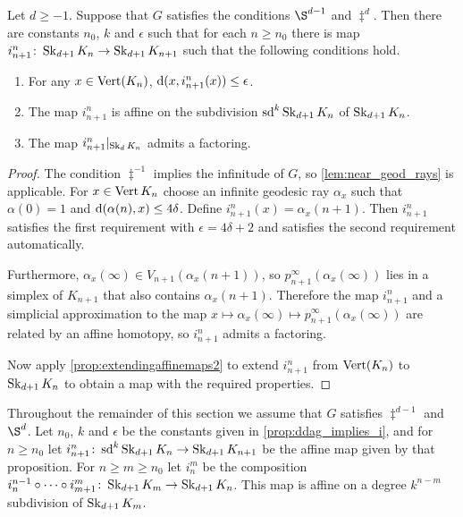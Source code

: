 \documentclass[a4paper]{article}
\begin{document}
\begin{proposition}\label{prop:ddag_implies_i}
  Let $d \geq -1$. Suppose that $G$ satisfies the conditions $\S^{d-1}$ and
  $\ddag^{d}$. Then there are constants $n_0$, $k$ and $\epsilon$ such that for
  each $n\geq n_0$ there is map $i^n_{n+1}\colon\operatorname{Sk}_{d+1} K_n \to \operatorname{Sk}_{d+1}
  K_{n+1}$ such that the following conditions hold.
  \begin{enumerate}
    \item For any $x \in \operatorname{Vert}(K_n)$, $\operatorname{d}(x, i_{n+1}^n(x)) \leq
      \epsilon$.
    \item The map $i^n_{n+1}$ is affine on the subdivision $\operatorname{sd}^k\operatorname{Sk}_{d+1}
      K_n$ of $\operatorname{Sk}_{d+1}K_n$.
    \item The map $i^n_{n+1}\vert_{\operatorname{Sk}_d K_n}$ admits a factoring.
  \end{enumerate}
\end{proposition}

\begin{proof}
  The condition $\ddag^{-1}$ implies the infinitude of $G$, so
  \cref{lem:near_geod_rays} is applicable. For $x \in \operatorname{Vert}{K_n}$ choose an
  infinite geodesic ray $\alpha_x$ such that $\alpha(0) = 1$ and
  $\operatorname{d}(\alpha(n), x) \leq 4\delta$. Define $i^n_{n+1}(x) =
  \alpha_x(n+1)$. Then $i^n_{n+1}$ satisfies the first requirement with
  $\epsilon = 4\delta+2$ and satisfies the second requirement automatically.

  Furthermore, $\alpha_x(\infty) \in V_{n+1}(\alpha_x(n+1))$, so 
  $p^\infty_{n+1}(\alpha_x(\infty))$ lies in a simplex of $K_{n+1}$ that also 
  contains $\alpha_x(n+1)$.  Therefore the map $i^n_{n+1}$ and a simplicial 
  approximation to the map $x \mapsto \alpha_x(\infty) \mapsto p^\infty_{n+1} 
  (\alpha_x(\infty))$ are related by an affine homotopy, so $i^n_{n+1}$ admits a 
  factoring. 

  Now apply \cref{prop:extendingaffinemaps2} to extend $i^n_{n+1}$ from
  $\operatorname{Vert}(K_n)$ to $\operatorname{Sk}_{d+1} K_n$ to obtain a map with the required
  properties.
\end{proof}

Throughout the remainder of this section we assume that $G$ satisfies $\ddag^{d-1}$ 
and $\S^{d}$. Let $n_0$, $k$ and $\epsilon$ be the constants given in 
\cref{prop:ddag_implies_i}, and for $n\geq n_0$ let $i^n_{n+1} 
\colon \operatorname{sd}^k\operatorname{Sk}_{d+1} K_n \to \operatorname{Sk}_{d+1} K_{n+1}$ be the affine map given by 
that proposition.  For $n \geq m \geq n_0$ let $i^m_n$ be the composition 
$i^{n-1}_n \circ \dotsb \circ i^m_{m+1} \colon \operatorname{Sk}_{d+1} K_m \to 
\operatorname{Sk}_{d+1} K_n$.  This map is affine on a degree $k^{n-m}$ subdivision of 
$\operatorname{Sk}_{d+1} K_m$.
\end{document}
